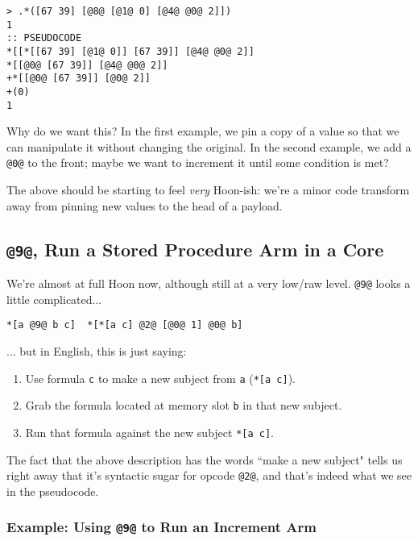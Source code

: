\documentclass[twoside]{article}
\begin{document}
\begin{lstlisting}[style=listingcode]
> .*([67 39] [@8@ [@1@ 0] [@4@ @0@ 2]])
1
:: PSEUDOCODE
*[[*[[67 39] [@1@ 0]] [67 39]] [@4@ @0@ 2]]
*[[@0@ [67 39]] [@4@ @0@ 2]]
+*[[@0@ [67 39]] [@0@ 2]]
+(0)
1
\end{lstlisting}

Why do we want this? In the first example, we pin a copy of a value so that we can manipulate it without changing the original. In the second example, we add a \lstinline[style=inlinecode]{@0@} to the front; maybe we want to increment it until some condition is met?

The above should be starting to feel \emph{very} Hoon-ish: we're a minor code transform away from pinning new values to the head of a payload.

\subsection{\lstinline[style=inlinecode]{@9@}, Run a Stored Procedure Arm in a Core}

We're almost at full Hoon now, although still at a very low/raw level. \lstinline[style=inlinecode]{@9@} looks a little complicated...

\begin{lstlisting}[style=listingcode]
*[a @9@ b c]  *[*[a c] @2@ [@0@ 1] @0@ b]
\end{lstlisting}

\noindent
... but in English, this is just saying:

\begin{enumerate}
  \item  Use formula \lstinline[style=inlinecode]{c} to make a new subject from \lstinline[style=inlinecode]{a} (\lstinline[style=inlinecode]{*[a c]}).
  \item  Grab the formula located at memory slot \lstinline[style=inlinecode]{b} in that new subject.
  \item  Run that formula against the new subject \lstinline[style=inlinecode]{*[a c]}.
\end{enumerate}

\noindent
The fact that the above description has the words ``make a new subject" tells us right away that it's syntactic sugar for opcode \lstinline[style=inlinecode]{@2@}, and that's indeed what we see in the pseudocode.

\subsubsection{Example: Using \lstinline[style=inlinecode]{@9@} to Run an Increment Arm}
\end{document}
